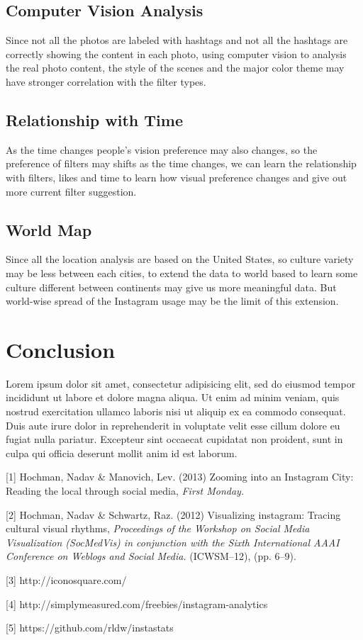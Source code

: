 \documentclass[conference]{acmsiggraph}
\begin{document}
\subsection{Computer Vision Analysis}
Since not all the photos are labeled with hashtags and not all the hashtags are correctly showing the content in each photo, using computer vision to analysis the real photo content, the style of the scenes and the major color theme may have stronger correlation with the filter types.
\subsection{Relationship with Time}
As the time changes people’s vision preference may also changes, so the preference of filters may shifts as the time changes, we can learn the relationship with filters, likes and time to learn how visual preference changes and give out more current filter suggestion.
\subsection{World Map}
Since all the location analysis are based on the United States, so culture variety may be less between each cities, to extend the data to world based to learn some culture different between continents may give us more meaningful data. But world-wise spread of the Instagram usage may be the limit of this extension.

\section{Conclusion}

Lorem ipsum dolor sit amet, consectetur adipisicing elit, sed do
eiusmod tempor incididunt ut labore et dolore magna aliqua. Ut enim ad
minim veniam, quis nostrud exercitation ullamco laboris nisi ut
aliquip ex ea commodo consequat. Duis aute irure dolor in
reprehenderit in voluptate velit esse cillum dolore eu fugiat nulla
pariatur. Excepteur sint occaecat cupidatat non proident, sunt in
culpa qui officia deserunt mollit anim id est laborum.


\begin{thebibliography}{10}




  [1] Hochman, Nadav \& Manovich, Lev. (2013) Zooming into an Instagram City: Reading the local through social media,
  \emph{ First Monday.}
  
  [2] Hochman, Nadav \& Schwartz, Raz. (2012) Visualizing instagram: Tracing cultural visual rhythms,
  \emph{Proceedings of the Workshop on Social Media Visualization (SocMedVis) in conjunction with the Sixth International AAAI Conference on Weblogs and Social Media.}
  (ICWSM--12), (pp. 6--9).
  
  [3] http://iconosquare.com/
  
  [4] http://simplymeasured.com/freebies/instagram-analytics
  
  [5] https://github.com/rldw/instastats
  
\end{thebibliography}
\end{document}

